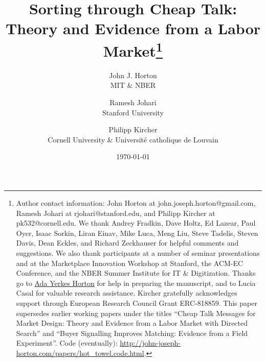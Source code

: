 \documentclass[12pt]{article}
\begin{document}
 

\newcommand{\WorkingTitle}{Sorting through Cheap Talk:\\
       Theory and Evidence from a Labor Market}

\begin{singlespacing}

\title{\WorkingTitle\footnote{Author contact information: John Horton at john.joseph.horton@gmail.com, Ramesh Johari at rjohari@stanford.edu, and Philipp Kircher at pk532@cornell.edu. 
     We thank Andrey Fradkin,
     Dave Holtz,
     Ed Lazear,
     Paul Oyer,
     Isaac Sorkin,
     Liran Einav,
     Mike Luca,
     Meng Liu,
     Steve Tadelis,
     Steven Davis,
     Dean Eckles, and Richard Zeckhauser for helpful comments and suggestions.
     We also thank participants at a number of seminar presentations and at the Marketplace Innovation Workshop at Stanford, the ACM-EC Conference, and the NBER Summer Institute for IT \& Digitization.
     Thanks go to \href{https://john-joseph-horton.com/papers/ayh.jpg}{Ada Yerkes Horton} for help in preparing the manuscript, and to Lucia Casal for valuable research assistance. Kircher gratefully acknowledges support through European Research Council Grant ERC-818859.
     This paper supersedes earlier working papers under the titles ``Cheap Talk Messages for Market Design: Theory and Evidence from a Labor Market with Directed Search'' and ``Buyer Signalling Improves Matching: Evidence from a Field Experiment''. 
     Code (eventually): \href{https://john-joseph-horton.com/papers/hot_towel.code.html}{http://john-joseph-horton.com/papers/hot\_towel.code.html}.
}}


\date{\today}

\author{John J. Horton\\MIT \& NBER \and Ramesh Johari\\Stanford University \and Philipp Kircher \\ Cornell University \& Universit\'e catholique de Louvain}
\maketitle


\end{singlespacing}
\end{document}
